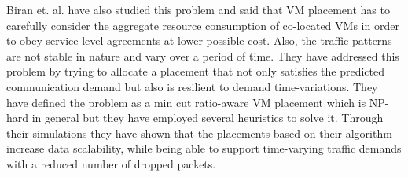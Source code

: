 Biran et. al. \cite{biran2012stable} have also studied this problem and said that VM placement has to carefully consider the aggregate resource consumption of co-located VMs in order to obey service level agreements at lower possible cost. Also, the traffic patterns are not stable in nature and vary over a period of time. They have addressed this problem by trying to allocate a placement that not only satisfies the predicted communication demand but also is resilient to demand time-variations. They have defined the problem as a min cut ratio-aware VM placement which is NP-hard in general but they have employed several heuristics to solve it. Through their simulations they have shown that the placements based on their algorithm increase data scalability, while being able to support time-varying traffic demands with a reduced number of dropped packets. 